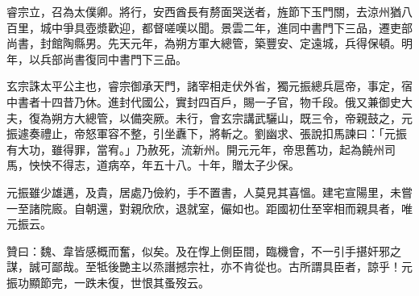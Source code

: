 \begin{pinyinscope}
 睿宗立，召為太僕卿。將行，安西酋長有剺面哭送者，旌節下玉門關，去涼州猶八百里，城中爭具壺漿歡迎，都督嗟嘆以聞。景雲二年，進同中書門下三品，遷吏部尚書，封館陶縣男。先天元年，為朔方軍大總管，築豐安、定遠城，兵得保頓。明年，以兵部尚書復同中書門下三品。



 玄宗誅太平公主也，睿宗御承天門，諸宰相走伏外省，獨元振總兵扈帝，事定，宿中書者十四昔乃休。進封代國公，實封四百戶，賜一子官，物千段。俄又兼御史大夫，復為朔方大總管，以備突厥。未行，會玄宗講武驪山，既三令，帝親鼓之，元振遽奏禮止，帝怒軍容不整，引坐纛下，將斬之。劉幽求、張說扣馬諫曰：「元振有大功，雖得罪，當宥。」乃赦死，流新州。開元元年，帝思舊功，起為饒州司馬，怏怏不得志，道病卒，年五十八。十年，贈太子少保。



 元振雖少雄邁，及貴，居處乃儉約，手不置書，人莫見其喜慍。建宅宣陽里，未嘗一至諸院廄。自朝還，對親欣欣，退就室，儼如也。距國初仕至宰相而親具者，唯元振云。



 贊曰：魏、韋皆感概而奮，似矣。及在惸上側臣間，臨機會，不一引手揕奸邪之謀，誠可鄙哉。至牴後艷主以烝譖撼宗社，亦不肯從也。古所謂具臣者，諒乎！元振功顯節完，一跌未復，世恨其蚤歿云。



\end{pinyinscope}